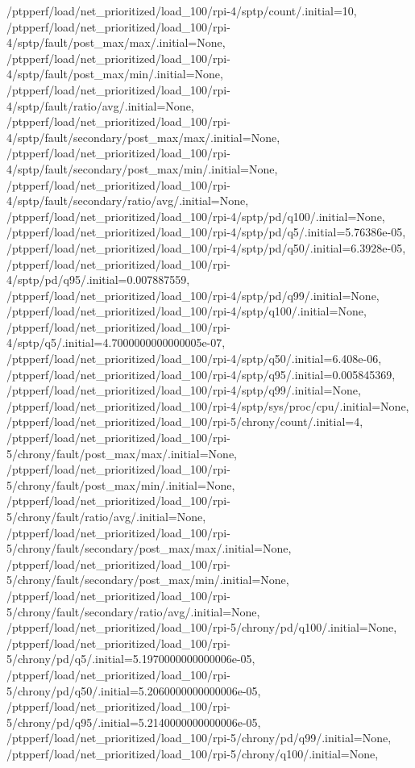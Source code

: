 {    /ptpperf/load/net_prioritized/load_100/rpi-4/sptp/count/.initial=10,
    /ptpperf/load/net_prioritized/load_100/rpi-4/sptp/fault/post_max/max/.initial=None,
    /ptpperf/load/net_prioritized/load_100/rpi-4/sptp/fault/post_max/min/.initial=None,
    /ptpperf/load/net_prioritized/load_100/rpi-4/sptp/fault/ratio/avg/.initial=None,
    /ptpperf/load/net_prioritized/load_100/rpi-4/sptp/fault/secondary/post_max/max/.initial=None,
    /ptpperf/load/net_prioritized/load_100/rpi-4/sptp/fault/secondary/post_max/min/.initial=None,
    /ptpperf/load/net_prioritized/load_100/rpi-4/sptp/fault/secondary/ratio/avg/.initial=None,
    /ptpperf/load/net_prioritized/load_100/rpi-4/sptp/pd/q100/.initial=None,
    /ptpperf/load/net_prioritized/load_100/rpi-4/sptp/pd/q5/.initial=5.76386e-05,
    /ptpperf/load/net_prioritized/load_100/rpi-4/sptp/pd/q50/.initial=6.3928e-05,
    /ptpperf/load/net_prioritized/load_100/rpi-4/sptp/pd/q95/.initial=0.007887559,
    /ptpperf/load/net_prioritized/load_100/rpi-4/sptp/pd/q99/.initial=None,
    /ptpperf/load/net_prioritized/load_100/rpi-4/sptp/q100/.initial=None,
    /ptpperf/load/net_prioritized/load_100/rpi-4/sptp/q5/.initial=4.7000000000000005e-07,
    /ptpperf/load/net_prioritized/load_100/rpi-4/sptp/q50/.initial=6.408e-06,
    /ptpperf/load/net_prioritized/load_100/rpi-4/sptp/q95/.initial=0.005845369,
    /ptpperf/load/net_prioritized/load_100/rpi-4/sptp/q99/.initial=None,
    /ptpperf/load/net_prioritized/load_100/rpi-4/sptp/sys/proc/cpu/.initial=None,
    /ptpperf/load/net_prioritized/load_100/rpi-5/chrony/count/.initial=4,
    /ptpperf/load/net_prioritized/load_100/rpi-5/chrony/fault/post_max/max/.initial=None,
    /ptpperf/load/net_prioritized/load_100/rpi-5/chrony/fault/post_max/min/.initial=None,
    /ptpperf/load/net_prioritized/load_100/rpi-5/chrony/fault/ratio/avg/.initial=None,
    /ptpperf/load/net_prioritized/load_100/rpi-5/chrony/fault/secondary/post_max/max/.initial=None,
    /ptpperf/load/net_prioritized/load_100/rpi-5/chrony/fault/secondary/post_max/min/.initial=None,
    /ptpperf/load/net_prioritized/load_100/rpi-5/chrony/fault/secondary/ratio/avg/.initial=None,
    /ptpperf/load/net_prioritized/load_100/rpi-5/chrony/pd/q100/.initial=None,
    /ptpperf/load/net_prioritized/load_100/rpi-5/chrony/pd/q5/.initial=5.1970000000000006e-05,
    /ptpperf/load/net_prioritized/load_100/rpi-5/chrony/pd/q50/.initial=5.2060000000000006e-05,
    /ptpperf/load/net_prioritized/load_100/rpi-5/chrony/pd/q95/.initial=5.2140000000000006e-05,
    /ptpperf/load/net_prioritized/load_100/rpi-5/chrony/pd/q99/.initial=None,
    /ptpperf/load/net_prioritized/load_100/rpi-5/chrony/q100/.initial=None,
}
